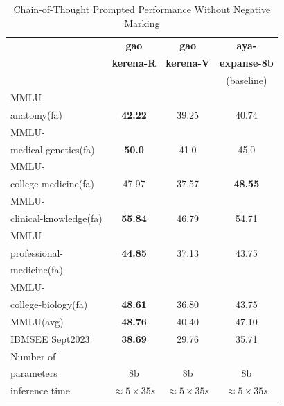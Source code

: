 \documentclass[conference]{IEEEtran}
\begin{document}
	\begin{table}[ht]
		\centering
		\caption{Chain-of-Thought Prompted Performance Without Negative Marking}
		\begin{tabular}{|l|c|c|c|}  
			\hline
			\textbf{} & \textbf{gao} & \textbf{gao} & \textbf{aya-} \\ 
			& \textbf{kerena-R} &  \textbf{kerena-V} & \textbf{expanse-8b} \\
			&   & &(baseline)  \\ \hline
			MMLU- &  &  &  \\ 
			anatomy(fa)  & \textbf{42.22} & 39.25  & 40.74 \\ \hline
			MMLU- &    &  &  \\
			medical-genetics(fa) & \textbf{50.0}  & 41.0  & 45.0 \\ \hline
			MMLU- &  &    &  \\
			college-medicine(fa) & 47.97  & 37.57  &\textbf{48.55}  \\ \hline
			MMLU- &    &  &  \\
			clinical-knowledge(fa)& \textbf{55.84} & 46.79  & 54.71  \\ \hline
			MMLU- &  &  &  \\
			professional-& \textbf{44.85} & 37.13 & 43.75 \\
                        medicine(fa)& &  &  \\ \hline
			MMLU- &  &  &  \\
			college-biology(fa)& \textbf{48.61} & 36.80 & 43.75 \\ \hline
			MMLU(avg) & \textbf{48.76} & 40.40 & 47.10 \\ \hline
			IBMSEE Sept2023 & \textbf{38.69}  & 29.76 & 35.71  \\ \hline
			Number of&  &  &  \\
			parameters & 8b & 8b & 8b \\ \hline
			inference time & $\approx 5 \times 35s$ & $\approx 5 \times 35s$ & $\approx 5 \times 35s$ \\  \hline
		\end{tabular}
		\label{tab:med_reasoning_capabillities_WNM_comparison}
	\end{table}
\end{document}
